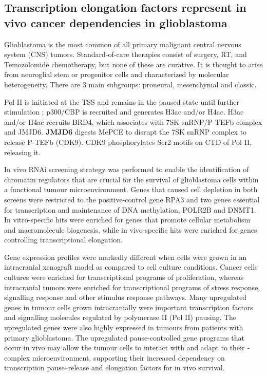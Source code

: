 \subsection{Transcription elongation factors represent in vivo cancer dependencies in glioblastoma}
Glioblastoma is the most common of all primary malignant central nervous system (CNS) tumors. Standard-of-care therapies consist of surgery, RT, and Temozolomide chemotherapy, but none of these are curative. It is thought to arise from neuroglial stem or progenitor cells and characterized by molecular heterogeneity. There are 3 main subgroups: proneural, mesenchymal and classic.

 
Pol II is initiated at the TSS and remains in the paused state until further stimulation ; p300/CBP is recruited and generates H3ac and/or H4ac. H3ac and/or H4ac recruits BRD4, which associates with 7SK snRNP/P-TEFb complex and JMJD6. \textbf{JMJD6} digests MePCE to disrupt the 7SK snRNP complex to release P-TEFb (CDK9). CDK9 phosphorylates Ser2 motifs on CTD of Pol II,  releasing it.

In vivo RNAi screening strategy was performed to enable the identification of chromatin regulators that are crucial for the survival of glioblastoma cells within a functional tumour microenvironment. Genes that caused cell depletion in both screens were restricted to the positive-control gene RPA3 and two genes essential for transcription and maintenance of DNA methylation, POLR2B and DNMT1. In vitro-specific hits were enriched for genes that promote cellular metabolism and macromolecule biogenesis, while in vivo-specific hits were enriched for genes controlling transcriptional elongation.

Gene expression profiles were markedly different when cells were grown in an intracranial xenograft model as compared to cell culture conditions. Cancer cells cultures were enriched for transcriptional programs of proliferation, whereas intracranial tumors were enriched for transcriptional programs of stress response, signalling response and other stimulus response pathways. Many upregulated genes in tumour cells grown intracranially were important transcription factors and signalling molecules regulated by polymerase II (Pol II) pausing. The upregulated genes were also highly expressed in tumours from patients with primary glioblastoma. The upregulated pause-controlled gene programs that occur in vivo may allow the tumour cells to interact with and adapt to their ­complex microenvironment, supporting their increased dependency on transcription pause–release and elongation factors for in vivo survival.

